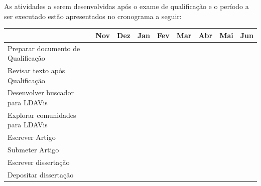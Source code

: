 \documentclass[12pt,a4paper]{article}
\begin{document}
As atividades a serem desenvolvidas após o exame de qualificação e o período a ser executado estão apresentados no cronograma a seguir:

\begin{center}
  \begin{tabular}{lllllllll}
                                         & Nov                    & Dez                      & Jan                    & Fev                    & Mar                     & Abr                    & Mai                     & Jun \\
  \hline                         
  Preparar documento de Qualificação                           &\cellcolor[gray]{0.9}   &\cellcolor[gray]{0.9}     &                        &                        &                         &                        &                         &                        \\
  Revisar texto após Qualificação                       &                        &\cellcolor[gray]{0.9}     &                        &                        &                         &                        &                         &                        \\
  Desenvolver buscador para LDAVis            &\cellcolor[gray]{0.9}   &                          &                        &                        &                         &                        &                         &                        \\
  Explorar comunidades para LDAVis   &                        &\cellcolor[gray]{0.9}     &                        &                        &                         &                        &                         &                        \\
  Escrever Artigo                      &                        &                          &\cellcolor[gray]{0.9}   &                        &                         &                        &                         &                        \\
  Submeter Artigo                    &                        &                          &                        &\cellcolor[gray]{0.9}   &                         &                        &                         &                        \\
  Escrever dissertação                 &                        &                          &                        &                        &\cellcolor[gray]{0.9}    &\cellcolor[gray]{0.9}   &                         &                        \\
  Depositar dissertação                   &                        &                          &                        &                        &                         &\cellcolor[gray]{0.9}   &                         &                        \\
  \hline
  \end{tabular}
\end{center}

\def\refname{REFERÊNCIAS BIBLIOGRÁFICAS}


\end{document}
